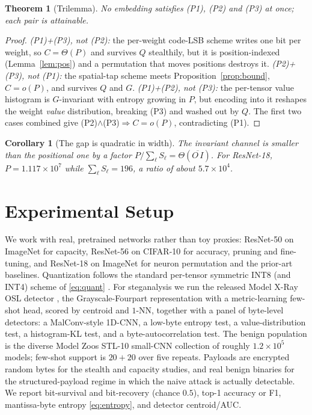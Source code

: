 \documentclass[a4paper,fleqn]{cas-dc}
\theoremstyle{plain}
\newtheorem{theorem}{Theorem}
\newtheorem{corollary}{Corollary}
\theoremstyle{remark}
\begin{document}
\begin{theorem}[Trilemma]\label{thm:tri}
No embedding satisfies \textup{(P1)}, \textup{(P2)} and \textup{(P3)} at once; each
pair is attainable.
\end{theorem}
\begin{proof}
\emph{(P1)+(P3), not (P2):} the per-weight code-LSB scheme writes one bit per weight,
so $C=\Theta(P)$ and survives $Q$ stealthily, but it is position-indexed
(Lemma~\ref{lem:pos}) and a permutation that moves positions destroys it. \emph{(P2)+(P3),
not (P1):} the spatial-tap scheme meets Proposition~\ref{prop:bound}, $C=o(P)$, and
survives $Q$ and $G$. \emph{(P1)+(P2), not (P3):} the per-tensor value histogram is
$G$-invariant with entropy growing in $P$, but encoding into it reshapes the weight
\emph{value} distribution, breaking (P3) and washed out by $Q$. The first two cases
combined give (P2)$\wedge$(P3)$\Rightarrow C=o(P)$, contradicting (P1).
\end{proof}

\begin{corollary}[The gap is quadratic in width]\label{cor:gap}
The invariant channel is smaller than the positional one by a factor
$P/\sum_\ell S_\ell=\Theta(\overline{O\,I})$. For ResNet-18, $P=1.117\times10^{7}$ while
$\sum_\ell S_\ell=196$, a ratio of about $5.7\times10^{4}$.
\end{corollary}

\section{Experimental Setup}\label{sec:setup}
We work with real, pretrained networks rather than toy proxies: ResNet-50
\citep{he2016resnet} on ImageNet \citep{deng2009imagenet} for capacity, ResNet-56 on
CIFAR-10 \citep{krizhevsky2009cifar} for accuracy, pruning and fine-tuning, and
ResNet-18 on ImageNet for neuron permutation and the prior-art baselines. Quantization
follows the standard per-tensor symmetric INT8 (and INT4) scheme of \eqref{eq:quant}
\citep{nagel2021whitepaper}.
For steganalysis we run the released Model X-Ray OSL detector
\citep{gilkarov2026modelxray}, the Grayscale-Fourpart representation with a
metric-learning few-shot head, scored by centroid and $1$-NN, together with a panel
of byte-level detectors: a MalConv-style 1D-CNN, a low-byte entropy test, a
value-distribution test, a histogram-KL test, and a byte-autocorrelation test. The
benign population is the diverse Model Zoos STL-10 small-CNN collection
\citep{schurholt2022modelzoos} of roughly $1.2\times10^{5}$ models; few-shot support is
$20{+}20$ over five repeats. Payloads are encrypted random
bytes for the stealth and capacity studies, and real benign binaries for the
structured-payload regime in which the naive attack is actually detectable. We report
bit-survival and bit-recovery (chance $0.5$), top-1 accuracy or F1, mantissa-byte
entropy \eqref{eq:entropy}, and detector centroid/AUC.
\end{document}
